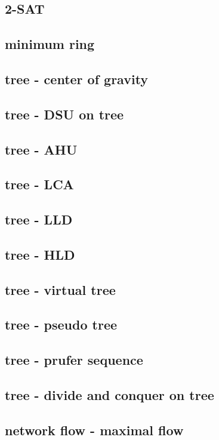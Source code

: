 \documentclass[UTF8, a4paper, titlepage, twoside]{ctexart}
\begin{document}
\subsection{2-SAT}


\subsection{minimum ring}


\subsection{tree - center of gravity}
\subsection{tree - DSU on tree}
\subsection{tree - AHU}
\subsection{tree - LCA}
\subsection{tree - LLD}
\subsection{tree - HLD}
\subsection{tree - virtual tree}
\subsection{tree - pseudo tree}
\subsection{tree - prufer sequence}
\subsection{tree - divide and conquer on tree}

\subsection{network flow - maximal flow}


\end{document}
